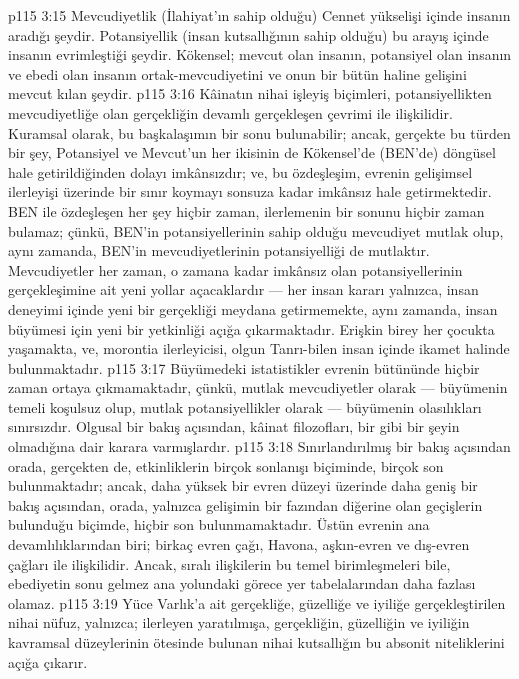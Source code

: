 \vs p115 3:15 Mevcudiyetlik (İlahiyat’ın sahip olduğu) Cennet yükselişi içinde insanın aradığı şeydir. Potansiyellik (insan kutsallığının sahip olduğu) bu arayış içinde insanın evrimleştiği şeydir. Kökensel; mevcut olan insanın, potansiyel olan insanın ve ebedi olan insanın ortak\hyp{}mevcudiyetini ve onun bir bütün haline gelişini mevcut kılan şeydir.
\vs p115 3:16 Kâinatın nihai işleyiş biçimleri, potansiyellikten mevcudiyetliğe olan gerçekliğin devamlı gerçekleşen çevrimi ile ilişkilidir. Kuramsal olarak, bu başkalaşımın bir sonu bulunabilir; ancak, gerçekte bu türden bir şey, Potansiyel ve Mevcut’un her ikisinin de Kökensel’de (BEN’de) döngüsel hale getirildiğinden dolayı imkânsızdır; ve, bu özdeşleşim, evrenin gelişimsel ilerleyişi üzerinde bir sınır koymayı sonsuza kadar imkânsız hale getirmektedir. BEN ile özdeşleşen her şey hiçbir zaman, ilerlemenin bir sonunu hiçbir zaman bulamaz; çünkü, BEN’in potansiyellerinin sahip olduğu mevcudiyet mutlak olup, aynı zamanda, BEN’in mevcudiyetlerinin potansiyelliği de mutlaktır. Mevcudiyetler her zaman, o zamana kadar imkânsız olan potansiyellerinin gerçekleşimine ait yeni yollar açacaklardır --- her insan kararı yalnızca, insan deneyimi içinde yeni bir gerçekliği meydana getirmemekte, aynı zamanda, insan büyümesi için yeni bir yetkinliği açığa çıkarmaktadır. Erişkin birey her çocukta yaşamakta, ve, morontia ilerleyicisi, olgun Tanrı\hyp{}bilen insan içinde ikamet halinde bulunmaktadır.
\vs p115 3:17 Büyümedeki istatistikler evrenin bütününde hiçbir zaman ortaya çıkmamaktadır, çünkü, mutlak mevcudiyetler olarak --- büyümenin temeli koşulsuz olup, mutlak potansiyellikler olarak --- büyümenin olasılıkları sınırsızdır. Olgusal bir bakış açısından, kâinat filozofları, bir  gibi bir şeyin olmadığına dair karara varmışlardır.
\vs p115 3:18 Sınırlandırılmış bir bakış açısından orada, gerçekten de, etkinliklerin birçok sonlanışı biçiminde, birçok son bulunmaktadır; ancak, daha yüksek bir evren düzeyi üzerinde daha geniş bir bakış açısından, orada, yalnızca gelişimin bir fazından diğerine olan geçişlerin bulunduğu biçimde, hiçbir son bulunmamaktadır. Üstün evrenin ana devamlılıklarından biri; birkaç evren çağı, Havona, aşkın\hyp{}evren ve dış\hyp{}evren çağları ile ilişkilidir. Ancak, sıralı ilişkilerin bu temel birimleşmeleri bile, ebediyetin sonu gelmez ana yolundaki görece yer tabelalarından daha fazlası olamaz.
\vs p115 3:19 Yüce Varlık’a ait gerçekliğe, güzelliğe ve iyiliğe gerçekleştirilen nihai nüfuz, yalnızca; ilerleyen yaratılmışa, gerçekliğin, güzelliğin ve iyiliğin kavramsal düzeylerinin ötesinde bulunan nihai kutsallığın bu absonit niteliklerini açığa çıkarır.
